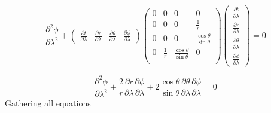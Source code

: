 \begin{equation}
    \frac{\partial^2 \phi}{\partial \lambda^2} +
    \begin{pmatrix}
        \frac{\partial t}{\partial \lambda}      &
        \frac{\partial r}{\partial \lambda}      &
        \frac{\partial \theta}{\partial \lambda} &
        \frac{\partial \phi}{\partial \lambda}
    \end{pmatrix}
    \begin{pmatrix}
        0 & 0           & 0                             & 0                             \\
        0 & 0           & 0                             & \frac{1}{r}                   \\
        0 & 0           & 0                             & \frac{\cos\theta}{\sin\theta} \\
        0 & \frac{1}{r} & \frac{\cos\theta}{\sin\theta} & 0                             \\
    \end{pmatrix}
    \begin{pmatrix}
        \frac{\partial t}{\partial \lambda}      \\[6pt]
        \frac{\partial r}{\partial \lambda}      \\[6pt]
        \frac{\partial \theta}{\partial \lambda} \\[6pt]
        \frac{\partial \phi}{\partial \lambda}
    \end{pmatrix} = 0
\end{equation}

\begin{equation}
    \frac{\partial^2 \phi}{\partial \lambda^2} +
    \frac{2}{r} \frac{\partial r}{\partial \lambda}\frac{\partial \phi}{\partial \lambda} +
    2\frac{\cos\theta}{\sin\theta} \frac{\partial \theta}{\partial \lambda}\frac{\partial \phi}{\partial \lambda} = 0
\end{equation}
%
Gathering all equations
%

